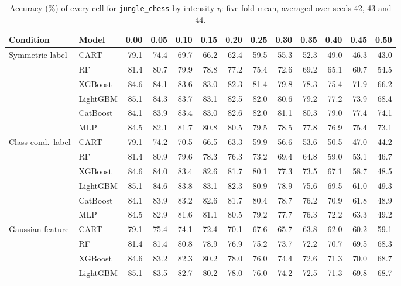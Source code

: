 \begin{table}[p]
\centering
\tiny
\setlength{\tabcolsep}{2.6pt}
\caption{Accuracy (\%) of every cell for \texttt{jungle\_chess} by intensity $\eta$: five-fold mean, averaged over seeds 42, 43 and 44.}
\label{tab:grid_jungle_chess}
\begin{tabular}{@{}llrrrrrrrrrrr@{}}
\toprule
Condition & Model & 0.00 & 0.05 & 0.10 & 0.15 & 0.20 & 0.25 & 0.30 & 0.35 & 0.40 & 0.45 & 0.50 \\
\midrule
Symmetric label & CART & 79.1 & 74.4 & 69.7 & 66.2 & 62.4 & 59.5 & 55.3 & 52.3 & 49.0 & 46.3 & 43.0 \\
 & RF & 81.4 & 80.7 & 79.9 & 78.8 & 77.2 & 75.4 & 72.6 & 69.2 & 65.1 & 60.7 & 54.5 \\
 & XGBoost & 84.6 & 84.1 & 83.6 & 83.0 & 82.3 & 81.4 & 79.8 & 78.3 & 75.4 & 71.9 & 66.2 \\
 & LightGBM & 85.1 & 84.3 & 83.7 & 83.1 & 82.5 & 82.0 & 80.6 & 79.2 & 77.2 & 73.9 & 68.4 \\
 & CatBoost & 84.1 & 83.9 & 83.4 & 83.0 & 82.6 & 82.0 & 81.1 & 80.3 & 79.0 & 77.4 & 74.1 \\
 & MLP & 84.5 & 82.1 & 81.7 & 80.8 & 80.5 & 79.5 & 78.5 & 77.8 & 76.9 & 75.4 & 73.1 \\
\midrule
Class-cond.\ label & CART & 79.1 & 74.2 & 70.5 & 66.5 & 63.3 & 59.9 & 56.6 & 53.6 & 50.5 & 47.0 & 44.2 \\
 & RF & 81.4 & 80.9 & 79.6 & 78.3 & 76.3 & 73.2 & 69.4 & 64.8 & 59.0 & 53.1 & 46.7 \\
 & XGBoost & 84.6 & 84.0 & 83.4 & 82.6 & 81.7 & 80.1 & 77.3 & 73.5 & 67.1 & 58.7 & 48.5 \\
 & LightGBM & 85.1 & 84.6 & 83.8 & 83.1 & 82.3 & 80.9 & 78.9 & 75.6 & 69.5 & 61.0 & 49.3 \\
 & CatBoost & 84.1 & 83.9 & 83.2 & 82.6 & 81.7 & 80.4 & 78.7 & 76.2 & 70.9 & 61.8 & 48.9 \\
 & MLP & 84.5 & 82.9 & 81.6 & 81.1 & 80.5 & 79.2 & 77.7 & 76.3 & 72.2 & 63.3 & 49.2 \\
\midrule
Gaussian feature & CART & 79.1 & 75.4 & 74.1 & 72.4 & 70.1 & 67.6 & 65.7 & 63.8 & 62.0 & 60.2 & 59.1 \\
 & RF & 81.4 & 81.4 & 80.8 & 78.9 & 76.9 & 75.2 & 73.7 & 72.2 & 70.7 & 69.5 & 68.3 \\
 & XGBoost & 84.6 & 83.2 & 82.3 & 80.2 & 78.0 & 76.0 & 74.4 & 72.6 & 71.3 & 70.0 & 68.7 \\
 & LightGBM & 85.1 & 83.5 & 82.7 & 80.2 & 78.0 & 76.0 & 74.2 & 72.5 & 71.3 & 69.8 & 68.7 \\

\end{tabular}
\end{table}
